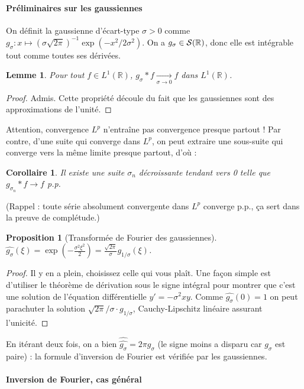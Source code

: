 \documentclass[a4paper, 11pt]{article}
\def\R{\mathbb{R}}
\def\S{{\cal{S}}}
\newtheorem*{proposition}{Proposition}
\newtheorem*{lemma}{Lemme}
\newtheorem*{corollary}{Corollaire}
\begin{document}
\paragraph{Préliminaires sur les gaussiennes}
On définit la gaussienne d'écart-type $\sigma > 0$ comme $g_\sigma : x \mapsto
(\sigma\sqrt{2\pi})^{-1}\exp(-x^2/2\sigma^2)$. On a $g_\sigma \in \S(\R)$, donc
elle est intégrable tout comme toutes ses dérivées.

\begin{lemma}
  Pour tout $f \in L^1(\R)$,
  $g_\sigma * f \xrightarrow[\sigma \to 0]{} f$ dans $L^1(\R)$.
\end{lemma}
\begin{proof}
  Admis. Cette propriété découle du fait que les gaussiennes sont des
  approximations de l'unité.
\end{proof}

Attention, convergence $L^p$ n'entraîne pas convergence presque partout ! Par
contre, d'une suite qui converge dans $L^p$, on peut extraire une sous-suite qui
converge vers la même limite presque partout, d'où :
\begin{corollary}
  Il existe une suite $\sigma_n$ décroissante tendant vers 0 telle que
  $g_{\sigma_n} * f \rightarrow f$ p.p.
\end{corollary}
(Rappel : toute série absolument convergente dans $L^p$ converge p.p., ça
sert dans la preuve de complétude.)

\begin{proposition}[Transformée de Fourier des gaussiennes]
  $\displaystyle \widehat{g_\sigma}(\xi) =
  \exp\left(- \frac{\sigma^2 \xi^2}{2} \right) =
  \frac{\sqrt{2\pi}}{\sigma} g_{1/\sigma}(\xi)$.
\end{proposition}
\begin{proof}
  Il y en a plein, choisissez celle qui vous plaît. Une façon simple est
  d'utiliser le théorème de dérivation sous le signe intégral pour montrer que
  c'est une solution de l'équation différentielle $y' = -\sigma^2xy $. Comme
  $\widehat{g_\sigma}(0) = 1$ on peut parachuter la solution $\sqrt{2\pi}/\sigma
  \cdot g_{1/\sigma}$, Cauchy-Lipschitz linéaire assurant l'unicité.
\end{proof}

En itérant deux fois, on a bien $\widehat{\widehat{g_{\sigma}}} = 2\pi g_\sigma$
(le signe moins a disparu car $g_\sigma$ est paire) : la formule d'inversion de
Fourier est vérifiée par les gaussiennes.

\paragraph{Inversion de Fourier, cas général}
\end{document}

